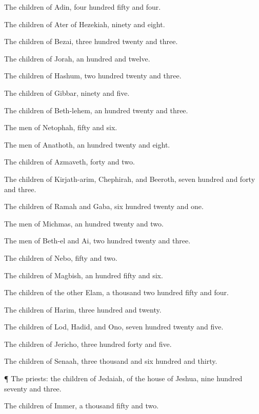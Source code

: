 {The
children of
Adin,
four
hundred
fifty and
four.

The
children of
Ater of
Hezekiah,
ninety and
eight.

The
children of
Bezai,
three
hundred
twenty and
three.

The
children of
Jorah, an
hundred and
twelve.

The
children of
Hashum, two
hundred
twenty and
three.

The
children of
Gibbar,
ninety and
five.

The
children of
Beth-lehem, an
hundred
twenty and
three.

The
men of
Netophah,
fifty and
six.

The
men of
Anathoth, an
hundred
twenty and
eight.

The
children of
Azmaveth,
forty and
two.

The
children of
Kirjath-arim,
Chephirah, and
Beeroth,
seven
hundred and
forty and
three.

The
children of
Ramah and
Gaba,
six
hundred
twenty and
one.

The
men of
Michmas, an
hundred
twenty and
two.

The
men of
Beth-el and
Ai, two
hundred
twenty and
three.

The
children of
Nebo,
fifty and
two.

The
children of
Magbish, an
hundred
fifty and
six.

The
children of the
other
Elam, a
thousand two
hundred
fifty and
four.

The
children of
Harim,
three
hundred and
twenty.

The
children of
Lod,
Hadid, and
Ono,
seven
hundred
twenty and
five.

The
children of
Jericho,
three
hundred
forty and
five.

The
children of
Senaah,
three
thousand and
six
hundred and
thirty.


\par }{\PP {}¶ The
priests: the
children of
Jedaiah, of the
house of
Jeshua,
nine
hundred
seventy and
three.

The
children of
Immer, a
thousand
fifty and
two.

}

